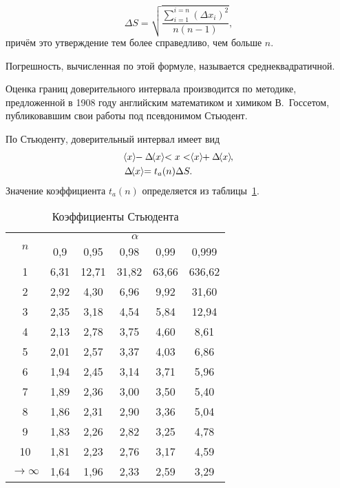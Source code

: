 \documentclass[a4paper, 12pt]{extarticle}
\newcommand{\nisum}{\sum\limits_{i=1}^{i=n}} %
\begin{document}
\begin{equation}
\label{eq:mean-error}
\Delta S = \sqrt{\frac{\nisum \left(\Delta x_i \right)^2}{n (n - 1)}},
\end{equation}
причём это утверждение тем более справедливо, чем больше $n$.

Погрешность, вычисленная по этой формуле, называется среднеквадратичной.

Оценка границ доверительного интервала производится по методике, предложенной в 1908 году английским математиком и химиком В.~Госсетом, публиковавшим свои работы под псевдонимом Стьюдент.

По Стьюденту, доверительный интервал имеет вид
\begin{align}
    &\MTDMean{x} - \Delta \MTDMean{x} < x < \MTDMean{x} + \Delta \MTDMean{x}, \\
    \label{eq:student-s}
    & \Delta  \MTDMean{x} = t_a(n)\Delta S.
\end{align}
Значение коэффициента $t_a(n)$ определяется из таблицы~\ref{tab:student-s-coef}.
\begin{table}[t]
\caption{Коэффициенты Стьюдента \label{tab:student-s-coef}}
\begin{center}
\begin{tabular}{|c|c|c|c|c|c|}
\hline
\multirow{2}{*}{$n$} & \multicolumn{5}{c|}{$\alpha$} \\ \cline{2-6}
   & 0,9 & 0,95 & 0,98 & 0,99 & 0,999 \\ \hline
1 & 6,31 & 12,71 &  31,82 &  63,66 & 636,62 \\ \hline
2 & 2,92 & 4,30  & 6,96 & 9,92 & 31,60 \\ \hline
3 & 2,35  & 3,18 & 4,54 & 5,84 & 12,94 \\ \hline
4 & 2,13 & 2,78 & 3,75 & 4,60 & 8,61 \\ \hline
5 & 2,01 & 2,57 & 3,37 & 4,03 & 6,86 \\ \hline
6 & 1,94 & 2,45 & 3,14 & 3,71 & 5,96 \\ \hline
7 & 1,89& 2,36 & 3,00 & 3,50 & 5,40 \\ \hline
8 &1,86 &2,31 &2,90 &3,36& 5,04 \\ \hline
9 &1,83 &2,26& 2,82 &3,25& 4,78  \\ \hline
10 &1,81 &2,23& 2,76 &3,17 &4,59  \\ \hline
$\to \infty$ &  1,64 & 1,96 & 2,33 &2,59 & 3,29 \\ \hline
\end{tabular}
\end{center}
\end{table}
\end{document}
